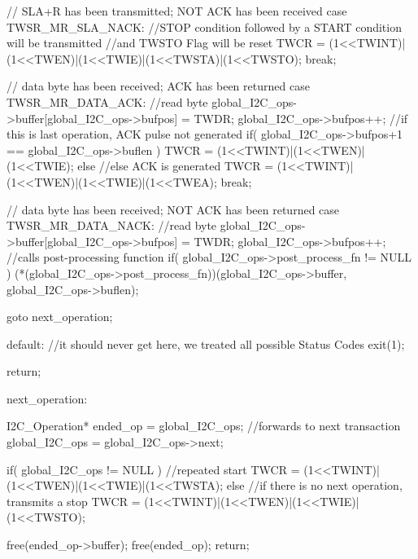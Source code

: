 \begin{ccode}
{{			// SLA+R has been transmitted; NOT ACK has been received
			case TWSR_MR_SLA_NACK:
				//STOP condition followed by a START condition will be transmitted
					//and TWSTO Flag will be reset
				TWCR = (1<<TWINT)|(1<<TWEN)|(1<<TWIE)|(1<<TWSTA)|(1<<TWSTO);
				break;
		
			// data byte has been received; ACK has been returned
			case TWSR_MR_DATA_ACK:
				//read byte
				global_I2C_ops->buffer[global_I2C_ops->bufpos] = TWDR;
				global_I2C_ops->bufpos++;
				//if this is last operation, ACK pulse not generated
				if( global_I2C_ops->bufpos+1 == global_I2C_ops->buflen )
					TWCR = (1<<TWINT)|(1<<TWEN)|(1<<TWIE);
				else //else ACK is generated
					TWCR = (1<<TWINT)|(1<<TWEN)|(1<<TWIE)|(1<<TWEA);
				break;
		
			// data byte has been received; NOT ACK has been returned
			case TWSR_MR_DATA_NACK:
				//read byte
				global_I2C_ops->buffer[global_I2C_ops->bufpos] = TWDR;
				global_I2C_ops->bufpos++;
				//calls post-processing function
				if( global_I2C_ops->post_process_fn != NULL )
					(*(global_I2C_ops->post_process_fn))(global_I2C_ops->buffer, global_I2C_ops->buflen);
			
				goto next_operation;
					
			default:
				//it should never get here, we treated all possible Status Codes
				exit(1);
		}
		return;
	
		next_operation: {
			I2C_Operation* ended_op = global_I2C_ops;
				//forwards to next transaction
			global_I2C_ops = global_I2C_ops->next;
		
			if( global_I2C_ops != NULL )	//repeated start
				TWCR = (1<<TWINT)|(1<<TWEN)|(1<<TWIE)|(1<<TWSTA);
			else 	//if there is no next operation, transmits a stop
				TWCR = (1<<TWINT)|(1<<TWEN)|(1<<TWIE)|(1<<TWSTO);
		
			free(ended_op->buffer);
			free(ended_op);
			return;
		}
	}
\end{ccode}
